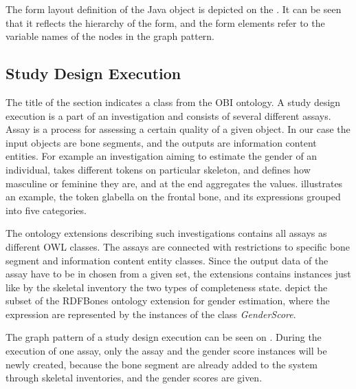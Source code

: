 
The form layout definition of the Java object is depicted on the . It can be seen that it reflects the hierarchy of the form, and the form elements refer to the variable names of the nodes in the graph pattern.


\subsection{Study Design Execution} \label{43}

The title of the section indicates a class from the OBI ontology. A study design execution is a part of an investigation and consists of several different assays. Assay is a process for assessing a certain quality of a given object. In our case the input objects are bone segments, and the outputs are information content entities. For example an investigation aiming to estimate the gender of an individual, takes different tokens on particular skeleton, and defines how masculine or feminine they are, and at the end aggregates the values.  illustrates an example, the token glabella on the frontal bone, and its expressions grouped into five categories.


The ontology extensions describing such investigations contains all assays as different OWL classes. The assays are connected with restrictions to specific bone segment and information content entity classes. Since the output data of the assay have to be in chosen from a given set, the extensions contains instances just like by the skeletal inventory the two types of completeness state.  depict the subset of the RDFBones ontology extension for gender estimation, where the expression are represented by the instances of the class \textit{GenderScore}.


The graph pattern of a study design execution can be seen on . During the execution of one assay, only the assay and the gender score instances will be newly created, because the bone segment are already added to the system through skeletal inventories, and the gender scores are given.

